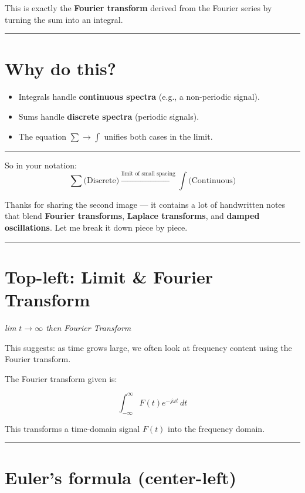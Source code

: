 \documentclass[UTF8,a4paper,11pt]{ctexart}
\begin{document}
This is exactly the \textbf{Fourier transform} derived from the Fourier series by turning the sum into an integral.

\bigskip\noindent\rule{\linewidth}{0.4pt}\bigskip

\section{Why do this?}

\begin{itemize}
  \item Integrals handle \textbf{continuous spectra} (e.g., a non-periodic signal).
  \item Sums handle \textbf{discrete spectra} (periodic signals).
  \item The equation $\sum \to \int$ unifies both cases in the limit.
\end{itemize}

\bigskip\noindent\rule{\linewidth}{0.4pt}\bigskip

So in your notation:
\[
\sum \text{(Discrete)} \xrightarrow{\text{limit of small spacing}} \int \text{(Continuous)}
\]

Thanks for sharing the second image --- it contains a lot of handwritten notes that blend \textbf{Fourier transforms}, \textbf{Laplace transforms}, and \textbf{damped oscillations}. Let me break it down piece by piece.

\bigskip\noindent\rule{\linewidth}{0.4pt}\bigskip

\section{Top-left: Limit \& Fourier Transform}

\noindent\textit{lim $t \to \infty$ then Fourier Transform}

This suggests: as time grows large, we often look at frequency content using the Fourier transform.

The Fourier transform given is:

\[
\int_{-\infty}^{\infty} F(t) e^{-j\omega t} \, dt
\]

This transforms a time-domain signal $F(t)$ into the frequency domain.

\bigskip\noindent\rule{\linewidth}{0.4pt}\bigskip

\section{Euler's formula (center-left)}
\end{document}
